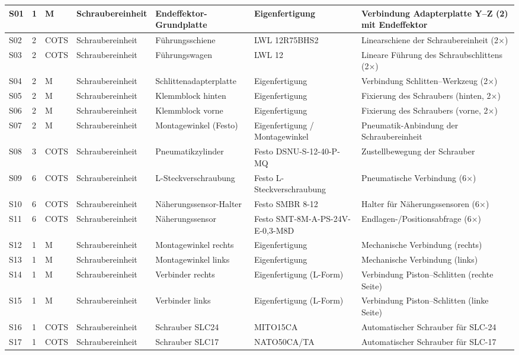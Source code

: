 \begin{landscape}
{\begin{longtable}{|l|l|l|l|l|p{4.6cm}|p{6.5cm}|}
S01 & 1 & M & Schraubereinheit & Endeffektor-Grundplatte & Eigenfertigung & Verbindung Adapterplatte Y--Z (2) mit Endeffektor \\
\hline
S02 & 2 & COTS & Schraubereinheit & Führungsschiene & LWL 12R75BHS2 & Linearschiene der Schraubereinheit (2×) \\
\hline
S03 & 2 & COTS & Schraubereinheit & Führungswagen & LWL 12 & Lineare Führung des Schraubschlittens (2×) \\
\hline
S04 & 2 & M & Schraubereinheit & Schlittenadapterplatte & Eigenfertigung & Verbindung Schlitten--Werkzeug (2×) \\
\hline
S05 & 2 & M & Schraubereinheit & Klemmblock hinten & Eigenfertigung & Fixierung des Schraubers (hinten, 2×) \\
\hline
S06 & 2 & M & Schraubereinheit & Klemmblock vorne & Eigenfertigung & Fixierung des Schraubers (vorne, 2×) \\
\hline
S07 & 2 & M & Schraubereinheit & Montagewinkel (Festo) & Eigenfertigung / Montagewinkel & Pneumatik-Anbindung der Schraubereinheit \\
\hline
S08 & 3 & COTS & Schraubereinheit & Pneumatikzylinder & Festo DSNU-S-12-40-P-MQ & Zustellbewegung der Schrauber \\
\hline
S09 & 6 & COTS & Schraubereinheit & L-Steckverschraubung & Festo L-Steckverschraubung & Pneumatische Verbindung (6×) \\
\hline
S10 & 6 & COTS & Schraubereinheit & Näherungssensor-Halter & Festo SMBR 8-12 & Halter für Näherungssensoren (6×) \\
\hline
S11 & 6 & COTS & Schraubereinheit & Näherungssensor & Festo SMT-8M-A-PS-24V-E-0,3-M8D & Endlagen-/Positionsabfrage (6×) \\
\hline
S12 & 1 & M & Schraubereinheit & Montagewinkel rechts & Eigenfertigung & Mechanische Verbindung (rechts) \\
\hline
S13 & 1 & M & Schraubereinheit & Montagewinkel links & Eigenfertigung & Mechanische Verbindung (links) \\
\hline
S14 & 1 & M & Schraubereinheit & Verbinder rechts & Eigenfertigung (L-Form) & Verbindung Piston--Schlitten (rechte Seite) \\
\hline
S15 & 1 & M & Schraubereinheit & Verbinder links & Eigenfertigung (L-Form) & Verbindung Piston--Schlitten (linke Seite) \\
\hline
S16 & 1 & COTS & Schraubereinheit & Schrauber SLC24 & MITO15CA & Automatischer Schrauber für SLC-24 \\
\hline
S17 & 1 & COTS & Schraubereinheit & Schrauber SLC17 & NATO50CA/TA & Automatischer Schrauber für SLC-17 \\
\hline


\end{longtable}}
\end{landscape}

